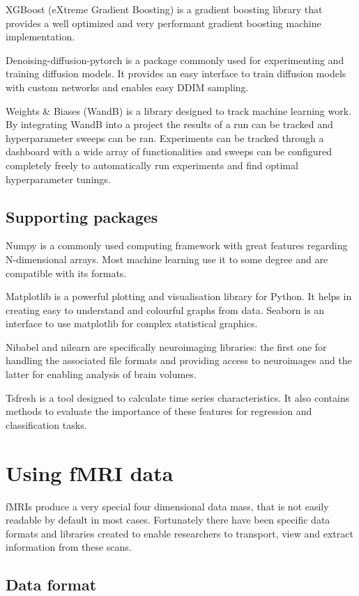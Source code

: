 	XGBoost (eXtreme Gradient Boosting) is a gradient boosting library that provides a well optimized and very performant gradient boosting machine implementation.
	
	Denoising-diffusion-pytorch is a package commonly used for experimenting and training diffusion models. It provides an easy interface to train diffusion models with custom networks and enables easy DDIM sampling.
	
	Weights \& Biases (WandB) is a library designed to track machine learning work. By integrating WandB into a project the results of a run can be tracked and hyperparameter sweeps can be ran. Experiments can be tracked through a dashboard with a wide array of functionalities and sweeps can be configured completely freely to automatically run experiments and find optimal hyperparameter tunings.
	
	
	\subsection{Supporting packages}
	Numpy is a commonly used computing framework with great features regarding N-dimensional arrays. Most machine learning use it to some degree and are compatible with its formats.
	
	Matplotlib is a powerful plotting and visualisation library for Python. It helps in creating easy to understand and colourful graphs from data. Seaborn is an interface to use matplotlib for complex statistical graphics.
	
	Nibabel and nilearn are specifically neuroimaging libraries: the first one for handling the associated file formats and providing access to neuroimages and the latter for enabling analysis of brain volumes.
	
	Tsfresh is a tool designed to calculate time series characteristics. It also contains methods to evaluate the importance of these features for regression and classification tasks.
	
	
\section{Using fMRI data}

	fMRIs produce a very special four dimensional data mass, that is not easily readable by default in most cases. Fortunately there have been specific data formats and libraries created to enable researchers to transport, view and extract information from these scans.

	\subsection{Data format}
	
